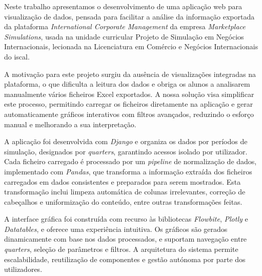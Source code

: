 




Neste trabalho apresentamos o desenvolvimento de uma aplicação web para visualização de dados, pensada para facilitar a análise da informação exportada da plataforma \textit{International Corporate Management} da empresa \textit{Marketplace Simulations}, usada na unidade curricular Projeto de Simulação em Negócios Internacionais, lecionada na Licenciatura em Comércio e Negócios Internacionais do \gls{iscal}.

A motivação para este projeto surgiu da ausência de visualizações integradas na plataforma, o que dificulta a leitura dos dados e obriga os alunos a analisarem manualmente vários ficheiros Excel exportados. A nossa solução visa simplificar este processo, permitindo carregar os ficheiros diretamente na aplicação e gerar automaticamente gráficos interativos com filtros avançados, reduzindo o esforço manual e melhorando a sua interpretação.

A aplicação foi desenvolvida com \textit{Django} e organiza os dados por períodos de simulação, designados por \textit{quarters}, garantindo acessos isolado por utilizador. Cada ficheiro carregado é processado por um \textit{pipeline} de normalização de dados, implementado com \textit{Pandas}, que transforma a informação extraída dos ficheiros carregados em dados consistentes e preparados para serem mostrados. Esta transformação inclui limpeza automática de colunas irrelevantes, correção de cabeçalhos e uniformização do conteúdo, entre outras transformações feitas.

A interface gráfica foi construída com recurso às bibliotecas \textit{Flowbite}, \textit{Plotly} e \textit{Datatables}, e oferece uma experiência intuitiva. Os gráficos são gerados dinamicamente com base nos dados processados, e suportam navegação entre \textit{quarters}, seleção de parâmetros e filtros. A arquitetura do sistema permite escalabilidade, reutilização de componentes e gestão autónoma por parte dos utilizadores.


